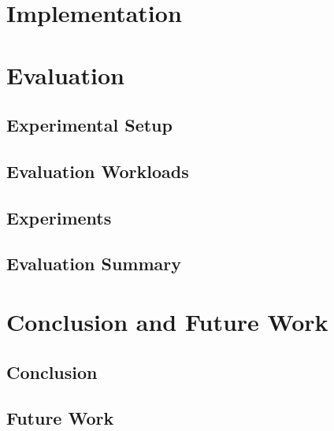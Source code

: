 \documentclass[UKenglish, a4paper]{ifimaster}
\begin{document}
\chapter{Implementation}
\label{ch:implementation}


\chapter{Evaluation}
\label{ch:evaluation}
    \section{Experimental Setup}
    \section{Evaluation Workloads}
    \section{Experiments}
    \section{Evaluation Summary}

\chapter{Conclusion and Future Work}
\label{ch:conclusion-and-future-work}
    \section{Conclusion}
    \section{Future Work}


\backmatter{}
\printbibliography{}
\end{document}
